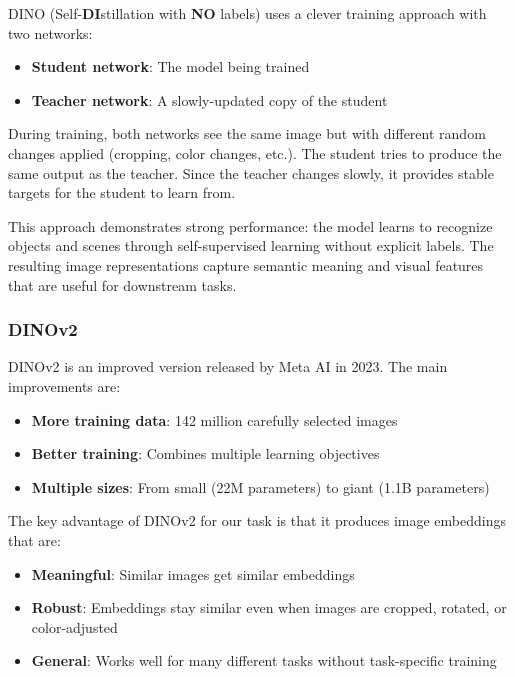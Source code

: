 \documentclass[
    english,
]{VUMIFPSbakalaurinis}
\begin{document}
DINO (Self-\textbf{DI}stillation with \textbf{NO} labels) \cite{Car21} uses a clever training approach with two networks:

\begin{itemize}
    \item \textbf{Student network}: The model being trained
    \item \textbf{Teacher network}: A slowly-updated copy of the student
\end{itemize}

During training, both networks see the same image but with different random changes applied (cropping, color changes, etc.). The student tries to produce the same output as the teacher. Since the teacher changes slowly, it provides stable targets for the student to learn from.

This approach demonstrates strong performance: the model learns to recognize objects and scenes through self-supervised learning without explicit labels. The resulting image representations capture semantic meaning and visual features that are useful for downstream tasks.

\subsubsection{DINOv2}

DINOv2 \cite{Oqu24} is an improved version released by Meta AI in 2023. The main improvements are:

\begin{itemize}
    \item \textbf{More training data}: 142 million carefully selected images
    \item \textbf{Better training}: Combines multiple learning objectives
    \item \textbf{Multiple sizes}: From small (22M parameters) to giant (1.1B parameters)
\end{itemize}

The key advantage of DINOv2 for our task is that it produces image embeddings that are:
\begin{itemize}
    \item \textbf{Meaningful}: Similar images get similar embeddings
    \item \textbf{Robust}: Embeddings stay similar even when images are cropped, rotated, or color-adjusted
    \item \textbf{General}: Works well for many different tasks without task-specific training
\end{itemize}
\end{document}
